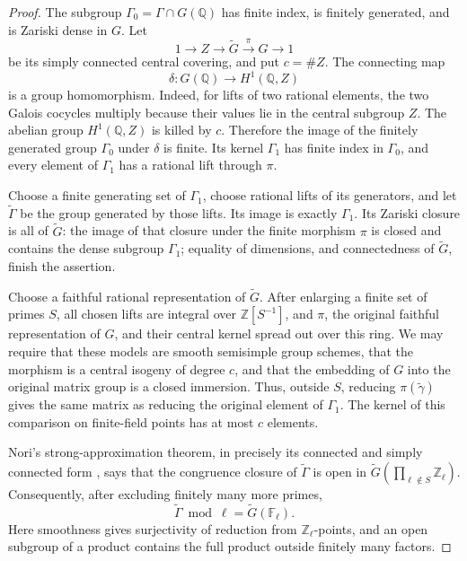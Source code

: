 \begin{proof}
The subgroup \(\Gamma_0=\Gamma\cap G(\mathbb Q)\) has finite index,
is finitely generated, and is Zariski dense in \(G\). Let
\[
     1\longrightarrow Z\longrightarrow \widetilde G
          \xrightarrow{\pi}G\longrightarrow1
\]
be its simply connected central covering, and put \(c=\#Z\).
The connecting map
\[
               \delta:G(\mathbb Q)\longrightarrow H^1(\mathbb Q,Z)
\]
is a group homomorphism. Indeed, for lifts of two rational elements,
the two Galois cocycles multiply because their values lie in the
central subgroup \(Z\). The abelian group \(H^1(\mathbb Q,Z)\)
is killed by \(c\). Therefore the image of the finitely generated
group \(\Gamma_0\) under \(\delta\) is finite. Its kernel
\(\Gamma_1\) has finite index in \(\Gamma_0\), and every element
of \(\Gamma_1\) has a rational lift through \(\pi\).

Choose a finite generating set of \(\Gamma_1\), choose rational
lifts of its generators, and let \(\widetilde\Gamma\) be the
group generated by those lifts. Its image is exactly \(\Gamma_1\).
Its Zariski closure is all of \(\widetilde G\): the image of that
closure under the finite morphism \(\pi\) is closed and contains
the dense subgroup \(\Gamma_1\); equality of dimensions, and
connectedness of \(\widetilde G\), finish the assertion.

Choose a faithful rational representation of \(\widetilde G\).
After enlarging a finite set of primes \(S\), all chosen lifts
are integral over \(\mathbb Z[S^{-1}]\), and \(\pi\), the
original faithful representation of \(G\), and their central
kernel spread out over this ring. We may require that these
models are smooth semisimple group schemes, that the morphism
is a central isogeny of degree \(c\), and that the embedding
of \(G\) into the original matrix group is a closed immersion.
Thus, outside \(S\), reducing \(\pi(\widetilde\gamma)\) gives
the same matrix as reducing the original element of \(\Gamma_1\).
The kernel of this comparison on finite-field points has at
most \(c\) elements.

Nori's strong-approximation theorem, in precisely its
connected and simply connected form
\cite[Theorem 5.4, printed p. 274]{AC_Nori1987}, says that the
congruence closure of \(\widetilde\Gamma\) is open in
\(\widetilde G(\prod_{\ell\notin S}\mathbb Z_\ell)\).
Consequently, after excluding finitely many more primes,
\[
       \widetilde\Gamma\bmod\ell
                      =\widetilde G(\mathbb F_\ell).
\]
Here smoothness gives surjectivity of reduction from
\(\mathbb Z_\ell\)-points, and an open subgroup of a product
contains the full product outside finitely many factors.


\end{proof}
